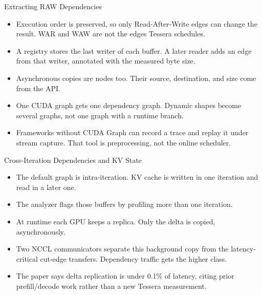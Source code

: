 \begin{frame}[t,label=mm_ts_raw_01]{Extracting RAW Dependencies}

  \par
  \vspace{.10cm}
  \begin{itemize}\footnotesize
    \setlength{\itemsep}{.08cm}
    \item Execution order is preserved, so only Read-After-Write edges can change the result. WAR and WAW are not the edges Tessera schedules.
    \item A registry stores the last writer of each buffer. A later reader adds an edge from that writer, annotated with the measured byte size.
    \item Asynchronous copies are nodes too. Their source, destination, and size come from the API.
    \item One CUDA graph gets one dependency graph. Dynamic shapes become several graphs, not one graph with a runtime branch.
    \item Frameworks without CUDA Graph can record a trace and replay it under stream capture. That tool is preprocessing, not the online scheduler.
  \end{itemize}
  \vspace{.12cm}
\end{frame}

\begin{frame}[t,label=mm_ts_raw_02]{Cross-Iteration Dependencies and KV State}

  \par
  \vspace{.10cm}
  \begin{itemize}\footnotesize
    \setlength{\itemsep}{.08cm}
    \item The default graph is intra-iteration. KV cache is written in one iteration and read in a later one.
    \item The analyzer flags those buffers by profiling more than one iteration.
    \item At runtime each GPU keeps a replica. Only the delta is copied, asynchronously.
    \item Two NCCL communicators separate this background copy from the latency-critical cut-edge transfers. Dependency traffic gets the higher class.
    \item The paper says delta replication is under 0.1\% of latency, citing prior prefill/decode work rather than a new Tessera measurement.
  \end{itemize}
  \vspace{.12cm}
\end{frame}

